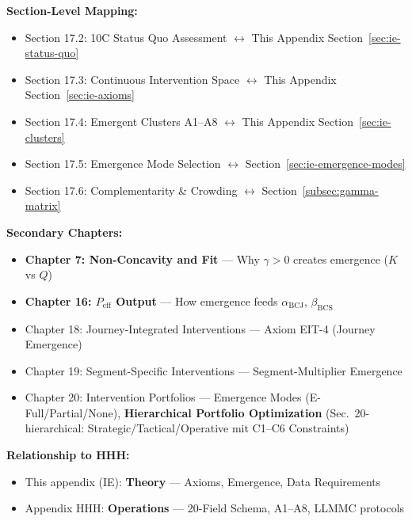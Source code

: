 \begin{tcolorbox}[colback=purple!5!white, colframe=purple!75!black,
    title=Chapter Linkage]
\vspace{0.5em}
\textbf{Section-Level Mapping:}
\begin{itemize}[nosep]
\item Section 17.2: 10C Status Quo Assessment $\leftrightarrow$ This Appendix Section~\ref{sec:ie-status-quo}
\item Section 17.3: Continuous Intervention Space $\leftrightarrow$ This Appendix Section~\ref{sec:ie-axioms}
\item Section 17.4: Emergent Clusters A1--A8 $\leftrightarrow$ This Appendix Section~\ref{sec:ie-clusters}
\item Section 17.5: Emergence Mode Selection $\leftrightarrow$ Section~\ref{sec:ie-emergence-modes}
\item Section 17.6: Complementarity \& Crowding $\leftrightarrow$ Section~\ref{subsec:gamma-matrix}
\end{itemize}

\textbf{Secondary Chapters:}
\begin{itemize}[nosep]
\item \textbf{Chapter 7: Non-Concavity and Fit} --- Why $\gamma > 0$ creates emergence ($K$ vs $Q$)
\item \textbf{Chapter 16: $P_{\text{eff}}$ Output} --- How emergence feeds $\alpha_{\text{BCJ}}$, $\beta_{\text{BCS}}$
\item Chapter 18: Journey-Integrated Interventions --- Axiom EIT-4 (Journey Emergence)
\item Chapter 19: Segment-Specific Interventions --- Segment-Multiplier Emergence
\item Chapter 20: Intervention Portfolios --- Emergence Modes (E-Full/Partial/None), \textbf{Hierarchical Portfolio Optimization} (Sec.\ 20-hierarchical: Strategic/Tactical/Operative mit C1--C6 Constraints)
\end{itemize}

\textbf{Relationship to HHH:}
\begin{itemize}[nosep]
\item This appendix (IE): \textbf{Theory} --- Axioms, Emergence, Data Requirements
\item Appendix HHH: \textbf{Operations} --- 20-Field Schema, A1--A8, LLMMC protocols
\end{itemize}

\end{tcolorbox}


